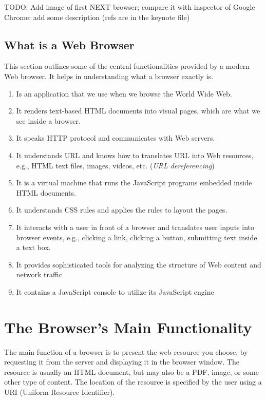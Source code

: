 \documentclass[a4paper, justified, notoc]{tufte-handout} %
\begin{document}
TODO: Add image of first NEXT browser; compare it with inspector of Google Chrome; add some description (refs are in the keynote file)


\subsection{What is a Web Browser}
\label{sub:what_is_a_web_browser}


This section outlines some of the central functionalities provided by a modern Web browser. It helps in understanding what a browser exactly is. 

\begin{enumerate}
	\item Is an application that we use when we browse the World Wide Web.
	\item It renders text-based HTML documents into visual pages, which are what we see inside a browser.
	\item It speaks HTTP protocol and communicates with Web servers.
	\item It understands URL and knows how to translates URL into Web resources, e.g., HTML text files, images, videos, etc. (\emph{URL dereferencing})
	\item It is a virtual machine that runs the JavaScript programs embedded inside HTML documents.
	\item It understands CSS rules and applies the rules to layout the pages.
	\item It interacts with a user in front of a browser and translates user inputs into browser events, e.g., clicking a link, clicking a button, submitting text inside a text box.
	\item It provides sophisticated tools for analyzing the structure of Web content and network traffic 
	\item It contains a JavaScript console to utilize its JavaScript engine 
\end{enumerate}





\section{The Browser's Main Functionality} %
\label{sec:the_browser_s_main_functionality}
The main function of a browser is to present the web resource you choose, by requesting it from the server and displaying it in the browser window. The resource is usually an HTML document, but may also be a PDF, image, or some other type of content. The location of the resource is specified by the user using a URI (Uniform Resource Identifier).
\end{document}
